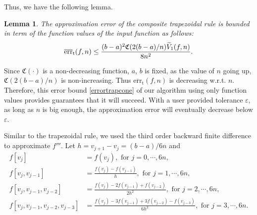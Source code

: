 \documentclass[draft]{iitthesis}
\DeclareMathOperator{\Var}{Var}
\newtheorem{lem}{Lemma}
\theoremstyle{definition}
\theoremstyle{remark}
\begin{document}
Thus, we have the following lemma.
\begin{lem}\label{lemmaerrorboundtrap}
    The approximation error of the composite trapezoidal rule is bounded in term of the function values of the input function as follows:
    \begin{equation}\label{errortrapcone}
      \overline{\textup{err}}_{\text{t}}(f,n)\leq \frac{(b-a)^2\mathfrak{C}(2(b-a)/n)\widetilde{V}_1(f,n)}{8n^2}.
    \end{equation}
\end{lem}

Since $\mathfrak{C}(\cdot)$ is a non-decreasing function, $a$, $b$ is fixed, as the value of $n$ going up, $\mathfrak{C}(2(b-a)/n)$ is non-increasing. Thus $\overline{\text{err}}_{\text{t}}(f,n)$ is decreasing w.r.t. $n$. Therefore, this error bound \eqref{errortrapcone} of our algorithm using only function values provides guarantees that it will succeed. With a user provided tolerance $\varepsilon$, as long as $n$ is big enough, the approximation error will eventually decrease below $\varepsilon$.


Similar to the trapezoidal rule, we used the third order backward finite difference to approximate $f'''$. Let $h=v_{j+1}-v_{j}=(b-a)/6n$ and
\begin{align*}
  f[v_{j}]&=f(v_{j}), \text{ for } j=0,\cdots, 6n,\\
  f[v_{j},v_{j-1}]&=\frac{f(v_{j})-f(v_{j-1})}{h},\text{ for } j=1, \cdots, 6n,\\
  f[v_{j},v_{j-1},v_{j-2}]&=\frac{f(v_{j})-2f(v_{j-1})+f(v_{j-2})}{2h^2},\text{ for } j=2, \cdots, 6n,\\
  f[v_{j},v_{j-1},v_{j-2},v_{j-3}]&=\frac{f(v_{j})-3f(v_{j-1})+3f(v_{j-2})-f(v_{j-3})}{6h^3}, \text{ for } j=3, \cdots, 6n.
\end{align*}

\end{document}
